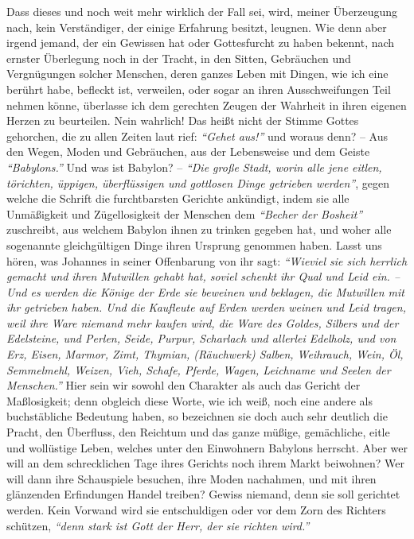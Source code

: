 Dass dieses und noch weit mehr wirklich der Fall sei, wird, meiner Überzeugung
nach, kein Verständiger, der einige Erfahrung besitzt, leugnen. Wie denn aber
irgend jemand, der ein Gewissen hat oder Gottesfurcht zu haben bekennt, nach
ernster Überlegung noch in der Tracht, in den Sitten, Gebräuchen und
Vergnügungen solcher Menschen, deren ganzes Leben mit Dingen, wie ich eine
berührt habe, befleckt ist, verweilen, oder sogar an ihren Ausschweifungen Teil
nehmen könne, überlasse ich dem gerechten Zeugen der Wahrheit in ihren eigenen
Herzen zu beurteilen. Nein wahrlich! Das heißt nicht der Stimme Gottes
gehorchen, die zu allen Zeiten laut rief: \textit{"`Gehet aus!"'} und woraus
denn? -- Aus den Wegen, Moden und Gebräuchen, aus der Lebensweise und dem Geiste
\textit{"`Babylons."'} Und was ist Babylon? --
\textit{"`Die große Stadt, worin alle jene eitlen,
törichten, üppigen, überflüssigen und gottlosen Dinge getrieben werden"'},
gegen
welche die Schrift die furchtbarsten Gerichte ankündigt,
indem sie alle
Unmäßigkeit und Zügellosigkeit der Menschen dem \textit{"`Becher der Bosheit"'}
zuschreibt,
aus welchem Babylon ihnen zu trinken gegeben hat, und woher alle sogenannte
gleichgültigen Dinge ihren Ursprung genommen haben.
Lasst uns hören, was Johannes in
seiner Offenbarung von ihr sagt:
\textit{"`Wieviel sie sich herrlich gemacht und ihren
Mutwillen gehabt hat, soviel schenkt ihr Qual und Leid ein. -- Und es werden die
Könige der Erde
sie beweinen und beklagen, die Mutwillen mit ihr getrieben
haben. Und die Kaufleute auf Erden werden weinen und Leid tragen, weil ihre
Ware niemand mehr kaufen wird, die Ware des Goldes, Silbers und der
Edelsteine, und Perlen, Seide, Purpur, Scharlach und allerlei
Edelholz, und von Erz,
Eisen, Marmor, Zimt, Thymian,
(Räuchwerk) Salben, Weihrauch, Wein, Öl, Semmelmehl,
Weizen, Vieh, Schafe, Pferde, Wagen, Leichname und Seelen der
Menschen."'}
Hier sein wir sowohl den Charakter
als auch das Gericht der Maßlosigkeit; denn obgleich diese
Worte, wie ich weiß,
noch eine andere als buchstäbliche Bedeutung
haben, so
bezeichnen sie
doch auch
sehr deutlich die Pracht, den Überfluss, den Reichtum und das ganze müßige,
gemächliche, eitle und wollüstige Leben, welches unter den Einwohnern
Babylons
herrscht. Aber wer will an dem schrecklichen Tage ihres
Gerichts noch ihrem
Markt beiwohnen? Wer will dann ihre Schauspiele besuchen, ihre Moden nachahmen,
und mit ihren glänzenden Erfindungen Handel treiben? Gewiss niemand, denn sie
soll gerichtet werden. Kein Vorwand wird sie entschuldigen oder vor dem Zorn
des Richters schützen,
\textit{"`denn stark ist Gott der Herr, der sie richten
wird."'}

